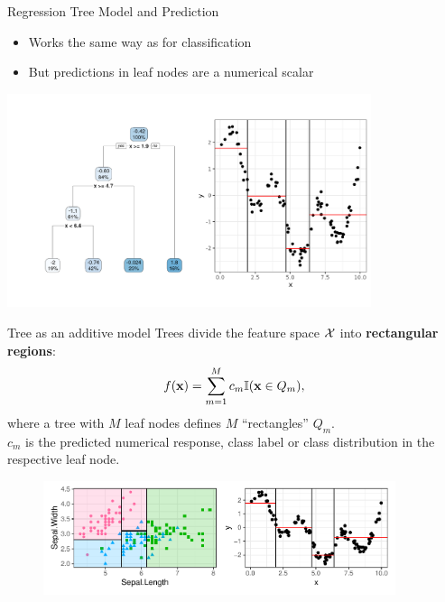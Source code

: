 \documentclass[11pt,compress,t,notes=noshow, xcolor=table]{beamer}
\begin{document}
\begin{vbframe}{Regression Tree Model and Prediction}
  \begin{itemize}
    \item Works the same way as for classification
    \item But predictions in leaf nodes are a numerical scalar

  \end{itemize}
\vspace{1cm}
\color{fgcolor}
{\centering \includegraphics[width=0.8\textwidth, keepaspectratio]{figure/tree-regr-depth3.pdf}

}

\end{vbframe}



\begin{vbframe}{Tree as an additive model}
Trees divide the feature space $\mathcal{X}$ into \textbf{rectangular regions}: 
  \begin{align*}
    f(\mathbf{x}) = \sum_{m=1}^M c_m \mathbb{I}(\mathbf{x} \in Q_m),
  \end{align*}
  where a tree with $M$ leaf nodes defines $M$ \enquote{rectangles} $Q_m$.\\
  $c_m$ is the predicted numerical response, class label or class
  distribution in the respective leaf node.
  \begin{figure}
\includegraphics[width=0.92\textwidth, keepaspectratio]{figure/combined-area-plot.pdf}
\end{figure}

\end{vbframe}
\end{document}
